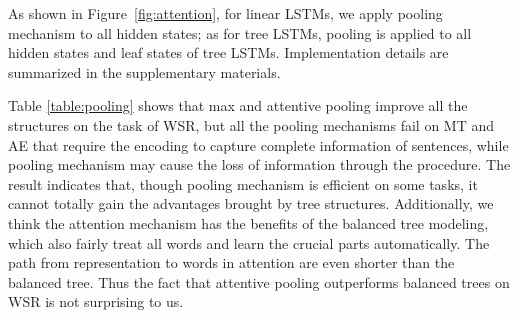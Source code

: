 \documentclass[11pt,a4paper]{article}
\begin{document}
As shown in Figure~\ref{fig:attention}, for linear LSTMs, we apply pooling mechanism to all hidden states; as for tree LSTMs, pooling is applied to all hidden states and leaf states of tree LSTMs. Implementation details are summarized in the supplementary materials.

Table \ref{table:pooling} shows that max and attentive pooling improve all the structures on the task of WSR, but all the pooling mechanisms fail on MT and AE that require the encoding to capture complete information of sentences, while pooling mechanism may cause the loss of information through the procedure. 
The result indicates that, though pooling mechanism is efficient on some tasks, it cannot totally gain the advantages brought by tree structures. Additionally, we think the attention mechanism has the benefits of the balanced tree modeling, which also fairly treat all words and learn the crucial parts automatically. The path from representation to words in attention are even shorter than the balanced tree. Thus the fact that attentive pooling outperforms balanced trees on WSR is not surprising to us.
\end{document}
